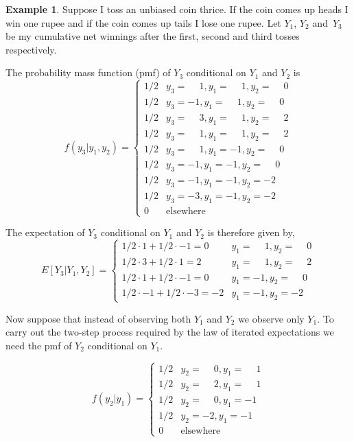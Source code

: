 \documentclass[11pt,reqno,openany]{amsbook}
\theoremstyle{plain}
\theoremstyle{definition}
\newtheorem{exmp}{Example}[chapter]
\begin{document}
\begin{exmp}\label{exmp:three-toss-conex}
Suppose I toss an unbiased coin thrice. If the coin comes up heads I
win one rupee and if the coin comes up tails I lose one rupee. Let
$Y_1$, $Y_2$ and~$Y_3$ be my cumulative net winnings after the first,
second and third tosses respectively.

The probability mass function (pmf) of $Y_3$ conditional on $Y_1$ and $Y_2$ is
\[f(y_3|y_1,y_2)=
\begin{cases}
1/2&y_3=\phantom{-}1,y_1=\phantom{-}1,y_2=\phantom{-}0\\
1/2&y_3=-1,y_1=\phantom{-}1,y_2=\phantom{-}0\\
1/2&y_3=\phantom{-}3,y_1=\phantom{-}1,y_2=\phantom{-}2\\
1/2&y_3=\phantom{-}1,y_1=\phantom{-}1,y_2=\phantom{-}2\\
1/2&y_3=\phantom{-}1,y_1=-1,y_2=\phantom{-}0\\
1/2&y_3=-1,y_1=-1,y_2=\phantom{-}0\\
1/2&y_3=-1,y_1=-1,y_2=-2\\
1/2&y_3=-3,y_1=-1,y_2=-2\\
0&\text{elsewhere}
\end{cases}\]

The expectation of $Y_3$ conditional on $Y_1$ and $Y_2$ is therefore
given by,
\[E[Y_3|Y_1,Y_2]=
\begin{cases}
1/2\cdot 1+1/2 \cdot -1=0&y_1=\phantom{-}1,y_2=\phantom{-}0\\
1/2\cdot 3+1/2 \cdot 1 =2&y_1=\phantom{-}1,y_2=\phantom{-}2\\
1/2\cdot 1+1/2\cdot -1 =0&y_1=-1,y_2=\phantom{-}0\\
1/2\cdot -1+1/2\cdot -3=-2&y_1=-1,y_2=-2
\end{cases}\]

Now suppose that instead of observing both $Y_1$ and $Y_2$ we observe
only $Y_1$. To carry out the two-step process required by the law of
iterated expectations we need the pmf of $Y_2$ conditional on $Y_1$.

\[f(y_2|y_1)=
\begin{cases}
1/2 & y_2 = \phantom{-}0, y_1=\phantom{-}1\\
1/2 & y_2 = \phantom{-}2, y_1=\phantom{-}1\\
1/2 & y_2 = \phantom{-}0, y_1=-1\\
1/2 & y_2 = -2, y_1=-1\\
0 & \text{elsewhere}
\end{cases}\]


\end{exmp}
\end{document}
